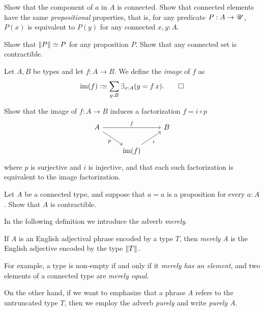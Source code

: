 \begin{xca}\label{xca:component-connected}
Show that the component of $a$ in $A$ is connected.
Show that connected elements have the same 
\emph{propositional} properties, that is, 
for any predicate $P:A\to{\mathscr{U}}$, $P(x)$ is equivalent
to $P(y)$ for any connected $x,y:A$. 
\end{xca}

\begin{xca}\label{xca:prop-set-trivia}
Show that $\lVert P\rVert \simeq P$ for any proposition $P$.
Show that any connected set is contractible.
\end{xca}

\begin{definition}\label{def:prop-image}
  Let $A,B$ be types and let $f : A \to B$. We define the \emph{image} of $f$ as
  \[
    \im(f) \defeq \sum_{y:B}\exists_{x:A}(y = f\,x).\qedhere
  \]
\end{definition}

\begin{xca}\label{xca:unique-fact-image}
  Show that the image of $f : A \to B$ induces a factorization $f = i\circ p$
  \[
    \begin{tikzcd}
      A \ar[rr,"f"]\ar[dr,"p"'] & & B \\
      & \im(f)\ar[ur,"i"'] &
    \end{tikzcd}
  \]
  where $p$ is surjective and $i$ is injective, and that each such factorization
  is equivalent to the image factorization.
\end{xca}

\begin{xca}\label{xca:connected-trivia}
Let $A$ be a connected type, and suppose that $a=a$ is a proposition for every $a:A$. 
Show that $A$ is contractible.
\end{xca}

In the following definition we introduce the adverb \emph{merely}.

\begin{definition}\label{def:merely}
  If \emph{A} is an English adjectival phrase encoded by a type $T$, 
  then \emph{merely A} is the English adjective encoded by the type $\lVert T\rVert$.
\end{definition}

For example, a type is non-empty if and only if it \emph{merely has an element}, and two elements of a connected type are \emph{merely equal}.

On the other hand, if we want to emphasize that a phrase \emph{A} refers to the
untruncated type $T$, then we employ the adverb \emph{purely}
and write \emph{purely A}.

